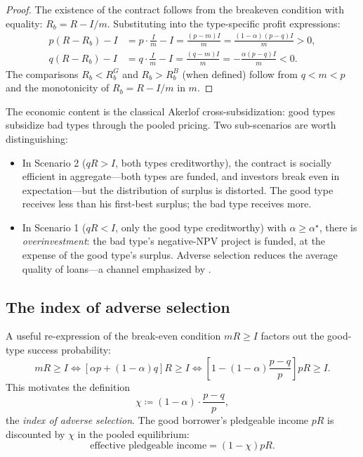 \documentclass[11pt,a4paper,oneside]{book}
\def\geq{\geqslant}
\theoremstyle{plain}
\theoremstyle{definition}
\theoremstyle{remark}
\numberwithin{equation}{chapter}
\begin{document}
\begin{proof}
The existence of the contract follows from the breakeven condition with equality: $R_b = R - I/m$.
Substituting into the type-specific profit expressions:
\begin{align*}
  p(R - R_b) - I &= p \cdot \frac{I}{m} - I = \frac{(p - m) I}{m} = \frac{(1 - \alpha)(p - q) I}{m} > 0, \\
  q(R - R_b) - I &= q \cdot \frac{I}{m} - I = \frac{(q - m) I}{m} = -\frac{\alpha(p - q) I}{m} < 0.
\end{align*}
The comparisons $R_b < R_b^{G}$ and $R_b > R_b^{B}$ (when defined) follow from $q < m < p$ and the monotonicity of $R_b = R - I/m$ in $m$.
\end{proof}

The economic content is the classical Akerlof cross-subsidization: good types subsidize bad types through the pooled pricing.
Two sub-scenarios are worth distinguishing:

\begin{itemize}
  \item In Scenario 2 ($qR > I$, both types creditworthy), the contract is socially efficient in aggregate---both types are funded, and investors break even in expectation---but the distribution of surplus is distorted.
  The good type receives less than his first-best surplus; the bad type receives more.
  \item In Scenario 1 ($qR < I$, only the good type creditworthy) with $\alpha \geq \alpha^\star$, there is \emph{overinvestment}: the bad type's negative-NPV project is funded, at the expense of the good type's surplus.
  Adverse selection reduces the average quality of loans---a channel emphasized by \citet{DeMezaWebb1987}.
\end{itemize}

\subsection{The index of adverse selection}

A useful re-expression of the break-even condition $mR \geq I$ factors out the good-type success probability:
\begin{equation*}
  mR \geq I
  \Longleftrightarrow
  [\alpha p + (1-\alpha) q] R \geq I
  \Longleftrightarrow
  \left[1 - (1 - \alpha) \frac{p - q}{p}\right] pR \geq I.
\end{equation*}
This motivates the definition
\begin{equation}\label{eq:lemons-chi}
  \chi \coloneqq (1 - \alpha) \cdot \frac{p - q}{p},
\end{equation}
the \emph{index of adverse selection}.
The good borrower's pledgeable income $pR$ is discounted by $\chi$ in the pooled equilibrium:
\begin{equation*}
  \text{effective pledgeable income} = (1 - \chi) pR.
\end{equation*}
\end{document}
